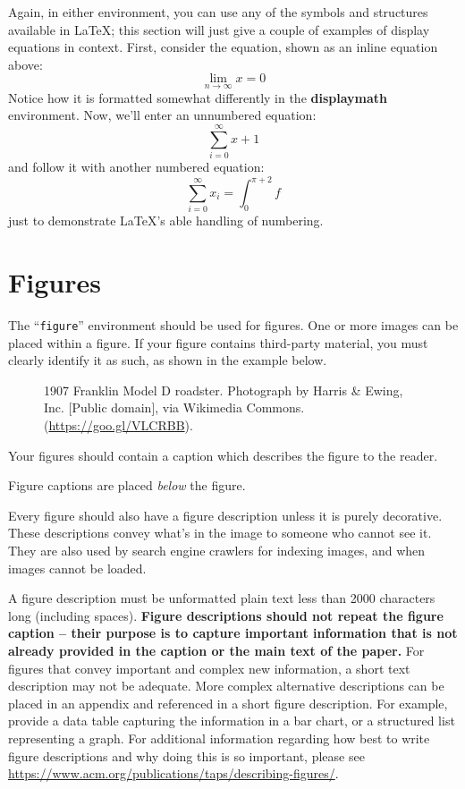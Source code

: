 \documentclass[sigconf,authordraft]{acmart}
\begin{document}
Again, in either environment, you can use any of the symbols and
structures available in \LaTeX\@; this section will just give a couple
of examples of display equations in context.  First, consider the
equation, shown as an inline equation above:
\begin{equation}
  \lim_{n\rightarrow \infty}x=0
\end{equation}
Notice how it is formatted somewhat differently in
the \textbf{displaymath}
environment.  Now, we'll enter an unnumbered equation:
\begin{displaymath}
  \sum_{i=0}^{\infty} x + 1
\end{displaymath}
and follow it with another numbered equation:
\begin{equation}
  \sum_{i=0}^{\infty}x_i=\int_{0}^{\pi+2} f
\end{equation}
just to demonstrate \LaTeX's able handling of numbering.

\section{Figures}

The ``\verb|figure|'' environment should be used for figures. One or
more images can be placed within a figure. If your figure contains
third-party material, you must clearly identify it as such, as shown
in the example below.
\begin{figure}[h]
  \centering
  \caption{1907 Franklin Model D roadster. Photograph by Harris \&
    Ewing, Inc. [Public domain], via Wikimedia
    Commons. (\url{https://goo.gl/VLCRBB}).}
\end{figure}

Your figures should contain a caption which describes the figure to
the reader.

Figure captions are placed {\itshape below} the figure.

Every figure should also have a figure description unless it is purely
decorative. These descriptions convey what’s in the image to someone
who cannot see it. They are also used by search engine crawlers for
indexing images, and when images cannot be loaded.

A figure description must be unformatted plain text less than 2000
characters long (including spaces).  {\bfseries Figure descriptions
  should not repeat the figure caption – their purpose is to capture
  important information that is not already provided in the caption or
  the main text of the paper.} For figures that convey important and
complex new information, a short text description may not be
adequate. More complex alternative descriptions can be placed in an
appendix and referenced in a short figure description. For example,
provide a data table capturing the information in a bar chart, or a
structured list representing a graph.  For additional information
regarding how best to write figure descriptions and why doing this is
so important, please see
\url{https://www.acm.org/publications/taps/describing-figures/}.
\end{document}
